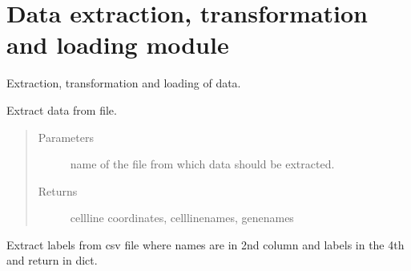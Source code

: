 \documentclass[letterpaper,10pt,english]{sphinxmanual}
\begin{document}
\section{Data extraction, transformation and loading module}
\label{\detokenize{dataETL:module-dataETL}}\label{\detokenize{dataETL:data-extraction-transformation-and-loading-module}}\label{\detokenize{dataETL::doc}}
\sphinxAtStartPar
Extraction, transformation and loading of data.

\begin{fulllineitems}
\label{\detokenize{dataETL:dataETL.extractData}}
\sphinxAtStartPar
Extract data from file.
\begin{quote}\begin{description}
\item[{Parameters}] \leavevmode
\sphinxAtStartPar
{} \textendash{} name of the file from which data should be extracted.

\item[{Returns}] \leavevmode
\sphinxAtStartPar
cellline coordinates, celllinenames, genenames

\end{description}\end{quote}

\end{fulllineitems}


\begin{fulllineitems}
\label{\detokenize{dataETL:dataETL.extractLabels}}
\sphinxAtStartPar
Extract labels from csv file where names are in 2nd column and     labels in the 4th and return in dict.

\end{fulllineitems}

\end{document}
